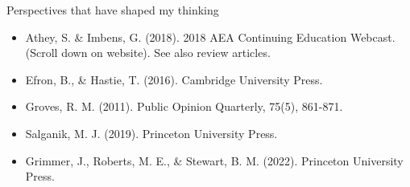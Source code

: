 \documentclass{beamer}
\newcommand\bref[2]{\href{#1}{\color{blue}{#2}}}
\begin{document}
\begin{frame}{Perspectives that have shaped my thinking}
\small
\begin{itemize}
\item Athey, S. \& Imbens, G. (2018).  \bref{https://www.aeaweb.org/conference/cont-ed/2018-webcasts}{Machine Learning and Econometrics.} 2018 AEA Continuing Education Webcast. (Scroll down on website). See also review articles.
\item Efron, B., \& Hastie, T. (2016). \bref{https://hastie.su.domains/CASI/}{Computer age statistical inference: Algorithms, evidence, and data science.} Cambridge University Press.
\item Groves, R. M. (2011). \bref{https://doi.org/10.1093/poq/nfr057}{Three eras of survey research.} Public Opinion Quarterly, 75(5), 861-871.
\item Salganik, M. J. (2019). \bref{https://www.bitbybitbook.com/}{Bit by bit: Social research in the digital age.} Princeton University Press.
\item Grimmer, J., Roberts, M. E., \& Stewart, B. M. (2022). \bref{https://press.princeton.edu/books/hardcover/9780691207544/text-as-data}{Text as data: A new framework for machine learning and the social sciences.} Princeton University Press.
\end{itemize}

\end{frame}
\end{document}
